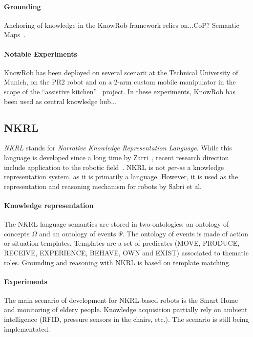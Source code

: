 \paragraph{Grounding} Anchoring of knowledge in the {\sc KnowRob} framework
relies on...CoP? Semantic Maps~\cite{Blodow2011}.



\paragraph{Notable Experiments} {\sc KnowRob} has been deployed on several
scenarii at the Technical University of Munich, on the PR2 robot and on a 2-arm
custom mobile manipulator in the scope of the ``assistive
kitchen''~\cite{Beetz2008} project. In these experiments, {\sc KnowRob} has
been used as central knowledge hub...

\subsection{NKRL}
\label{sect|nkrl}

\emph{NKRL} stands for \emph{Narrative Knowledge Representation Language}.
While this language is developed since a long time by Zarri~\cite{Zarri1997,
Zarri2008}, recent research direction include application to the robotic
field~\cite{Sabri2011}. NKRL is not {\it per-se} a knowledge representation
system, as it is primarily a language. However, it is used as the
representation and reasoning mechanism for robots by Sabri et al.

\paragraph{Knowledge representation} The NKRL language semantics are stored in
two ontologies: an ontology of concepts $\Omega$ and an ontology of events
$\Psi$. The ontology of events is made of action or situation templates.
Templates are a set of predicates (MOVE, PRODUCE, RECEIVE, EXPERIENCE, BEHAVE,
OWN and EXIST) associated to thematic roles. Grounding and reasoning with NKRL
is based on template matching.

\paragraph{Experiments} The main scenario of development for NKRL-based robots
is the Smart Home and monitoring of eldery people. Knowledge acquisition
partially rely on ambient intelligence (RFID, pressure sensors in the chairs,
etc.). The scenario is still being implementated.

